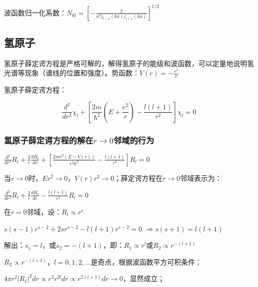 波函数归一化系数：$N_{kl}  = \left[ { - \frac{2}{{a^3 j_{l - 1} (ka)j_{l + 1} (ka)}}} \right]^{1/2} $


\subsection{氢原子}


氢原子薛定谔方程是严格可解的，解得氢原子的能级和波函数，可以定量地说明氢光谱等现象（谱线的位置和强度）。势函数：$V(r) =  - \frac{{e^2 }}{r}$

氢原子薛定谔方程：

\begin{equation}\label{15-9}
\frac{{d^2 }}{{dr^2 }}\chi _l  + \left[ {\frac{{2m}}{{\hbar ^2 }}\left( {E + \frac{{e^2 }}{r}} \right) - \frac{{l\left( {l + 1} \right)}}{{r^2 }}} \right]\chi _l  = 0
\end{equation}

\subsubsection{氢原子薛定谔方程的解在$r \rightarrow 0$邻域的行为}

\begin{center}
$\frac{{d^2 }}{{dr^2 }}R_l  + \frac{2}{r}\frac{{dR_l }}{{dr}} + \left[ {\frac{{2mr^2 \left( {E - V(r)} \right)}}{{r^2 \hbar ^2 }} - \frac{{l\left( {l + 1} \right)}}{{r^2 }}} \right]R_l  = 0$
\end{center}

当$r \to 0$时，$Er^2  \to 0$，$V(r)r^2  \to 0$；薛定谔方程在$r \to 0$邻域表示为：

\begin{center}
$\frac{{d^2 }}{{dr^2 }}R_l  + \frac{2}{r}\frac{{dR_l }}{{dr}} - \frac{{l\left( {l + 1} \right)}}{{r^2 }}R_l  = 0$
\end{center}

在$r = 0$邻域，设：$R_l  \propto r^s $

\begin{center}
$s(s - 1)r^{s - 2}  + 2sr^{s - 2}  - l(l + 1)r^{s - 2}  = 0$
$ \Rightarrow s(s + 1) = l(l + 1)$
\end{center}

解出：$s_1  = l$，或$s_2  =  - (l + 1)$，即：$R_1  \propto r^l $或$R_2  \propto r^{ - (l + 1)} $

$R_2  \propto r^{ - (l + 1)} $，$l = 0,1,2,...$是奇点，根据波函数平方可积条件：

$4\pi r^2 \left| {R_1 } \right|^2 dr \propto r^2 r^{2l} dr \propto r^{2(l + 1)} dr \to 0$，显然成立；

